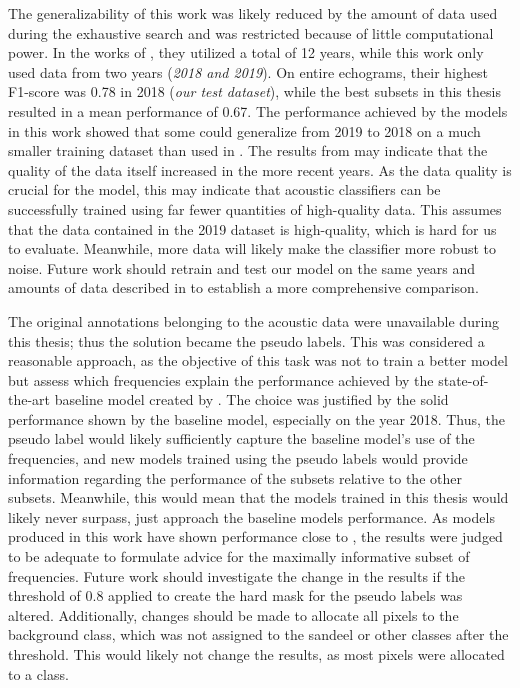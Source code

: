     The generalizability of this work was likely reduced by the amount of data used during the exhaustive search and was restricted because of little computational power. In the works of \citeauthor{brautaset2020acoustic}, they utilized a total of 12 years, while this work only used data from two years (\textit{2018 and 2019}). On entire echograms, their highest F1-score was 0.78 in 2018 (\textit{our test dataset}), while the best subsets in this thesis resulted in a mean performance of 0.67. The performance achieved by the models in this work showed that some could generalize from 2019 to 2018 on a much smaller training dataset than used in \citet{brautaset2020acoustic}. The results from \citeauthor{brautaset2020acoustic} may indicate that the quality of the data itself increased in the more recent years. As the data quality is crucial for the model, this may indicate that acoustic classifiers can be successfully trained using far fewer quantities of high-quality data. This assumes that the data contained in the 2019 dataset is high-quality, which is hard for us to evaluate. Meanwhile, more data will likely make the classifier more robust to noise. Future work should retrain and test our model on the same years and amounts of data described in \citeauthor{brautaset2020acoustic} to establish a more comprehensive comparison.  
    
    
    The original annotations belonging to the acoustic data were unavailable during this thesis; thus the solution became the pseudo labels. This was considered a reasonable approach, as the objective of this task was not to train a better model but assess which frequencies explain the performance achieved by the state-of-the-art baseline model created by \citet{brautaset2020acoustic}. The choice was justified by the solid performance shown by the baseline model, especially on the year 2018. Thus, the pseudo label would likely sufficiently capture the baseline model's use of the frequencies, and new models trained using the pseudo labels would provide information regarding the performance of the subsets relative to the other subsets. Meanwhile, this would mean that the models trained in this thesis would likely never surpass, just approach the baseline models performance. As models produced in this work have shown performance close to \citeauthor{brautaset2020acoustic}, the results were judged to be adequate to formulate advice for the maximally informative subset of frequencies. Future work should investigate the change in the results if the threshold of 0.8 applied to create the hard mask for the pseudo labels was altered. Additionally, changes should be made to allocate all pixels to the background class, which was not assigned to the sandeel or other classes after the threshold. This would likely not change the results, as most pixels were allocated to a class.

